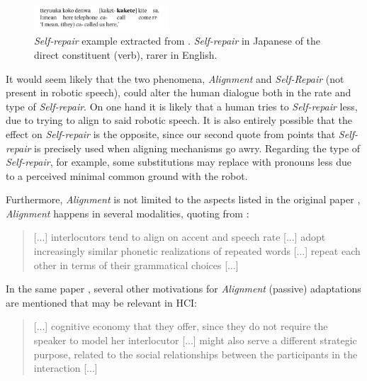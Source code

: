 \documentclass[11pt]{article}
\begin{document}
\begin{figure}[h]
	
	\centering
	\includegraphics[width=0.45\textwidth]{recycling_jap}
	\caption{\emph{Self-repair} example extracted from \cite{wouk2005syntax}. \emph{Self-repair} in Japanese of the direct constituent (verb), rarer in English.}
	\label{recycling_jap}
\end{figure}



It would seem likely that the two phenomena, \emph{Alignment} and \emph{Self-Repair} (not present in robotic speech), could alter the human dialogue both in the rate  and type of \emph{Self-repair}. On one hand it is likely that a human tries to \emph{Self-repair} less, due to trying to align to said robotic speech. It is also entirely possible that the effect on \emph{Self-repair} is the opposite, since our second quote from \cite{Branigan2000} points that \emph{Self-repair} is precisely used when aligning mechanisms go awry. Regarding the type of \emph{Self-repair}, for example, some substitutions may replace with pronouns less due to a perceived minimal common ground with the robot.


Furthermore, \emph{Alignment} is not limited to the aspects listed in the original paper \cite{pickering_garrod_2004}, \emph{Alignment} happens in several modalities, quoting from \cite{branigan2010linguistic}:

\begin{quote}
	[...] interlocutors tend to align on accent
	and speech rate [...] adopt increasingly similar phonetic realizations of repeated words [...]  repeat each other in terms of their grammatical choices [...] 
\end{quote}



In the same paper \cite{branigan2010linguistic}, several other motivations for \emph{Alignment} (passive) adaptations are mentioned that may be relevant in HCI:
\begin{quote}
	[...] cognitive economy that they offer, since they do not require the speaker to model her interlocutor [...]  might also serve a different strategic purpose, related to the social relationships between the participants in the interaction [...] 
\end{quote}
\end{document}
